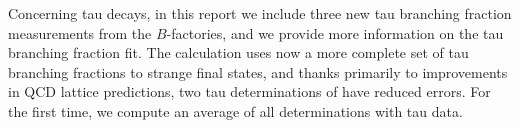 Concerning tau decays, in this report we include three new 
tau branching fraction measurements from the $B$-factories, 
and we provide more information on the tau branching fraction 
fit. The \Vus calculation uses now a more complete set of tau
branching fractions to strange final states, and thanks primarily to
improvements in QCD lattice predictions, two tau determinations of \Vus
have reduced errors. For the first time, we compute an average of all \Vus
determinations with tau data.
